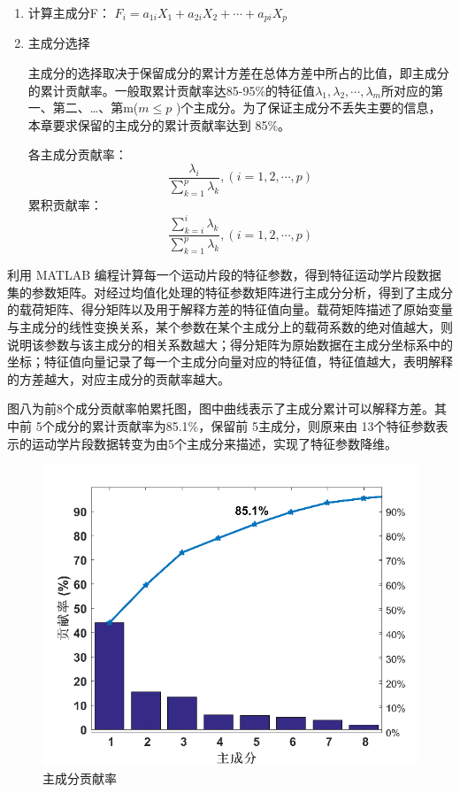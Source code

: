 \documentclass[bwprint]{gmcmthesis}
\begin{document}
\begin{enumerate}
\item 计算主成分F：
$F_i=a_{1i}X_1+a_{2i}X_2+\cdots +a_{pi}X_p$

\item 主成分选择

主成分的选择取决于保留成分的累计方差在总体方差中所占的比值，即主成分的累计贡献率。一般取累计贡献率达85-95\%的特征值$\lambda_1,\lambda_2,\cdots ,\lambda_m$所对应的第一、第二、…、第m($m\leq p$ )个主成分。为了保证主成分不丢失主要的信息，本章要求保留的主成分的累计贡献率达到 85\%。

各主成分贡献率：
\begin{equation}
\frac{\lambda_i}{\sum\limits^p_{k=1}\lambda_k},(i=1,2,\cdots,p)
\end{equation}
累积贡献率：
\begin{equation}
\frac{\sum\limits^i_{k=i}\lambda_k}{\sum\limits^p_{k=1}\lambda_k},(i=1,2,\cdots,p)
\end{equation}
\end{enumerate}


利用 MATLAB 编程计算每一个运动片段的特征参数，得到特征运动学片段数据集的参数矩阵。对经过均值化处理的特征参数矩阵进行主成分分析，得到了主成分的载荷矩阵、得分矩阵以及用于解释方差的特征值向量。载荷矩阵描述了原始变量与主成分的线性变换关系，某个参数在某个主成分上的载荷系数的绝对值越大，则说明该参数与该主成分的相关系数越大\cite{c4}；得分矩阵为原始数据在主成分坐标系中的坐标；特征值向量记录了每一个主成分向量对应的特征值，特征值越大，表明解释的方差越大，对应主成分的贡献率越大。

图八为前8个成分贡献率帕累托图，图中曲线表示了主成分累计可以解释方差。其中前 5个成分的累计贡献率为85.1\%，保留前 5主成分，则原来由 13个特征参数表示的运动学片段数据转变为由5个主成分来描述，实现了特征参数降维。
\begin{figure}[htbp] %
\centering
\includegraphics[width=0.9\linewidth,angle=0]{figures/pca.png}
\caption{主成分贡献率}
\label{f7}
\end{figure}
\end{document}
